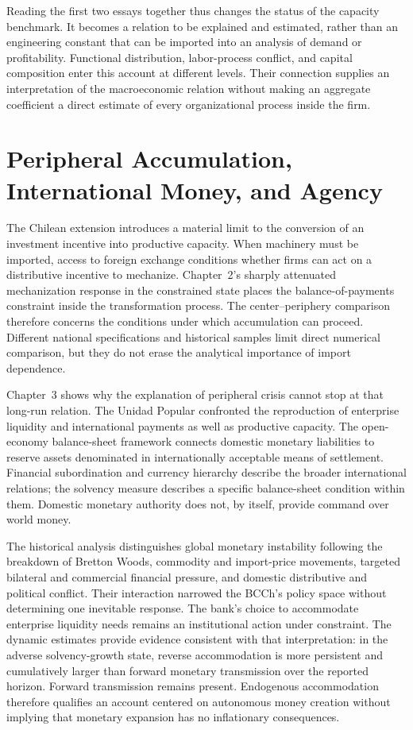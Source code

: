 Reading the first two essays together thus changes the status of the capacity benchmark. It becomes a relation to be explained and estimated, rather than an engineering constant that can be imported into an analysis of demand or profitability. Functional distribution, labor-process conflict, and capital composition enter this account at different levels. Their connection supplies an interpretation of the macroeconomic relation without making an aggregate coefficient a direct estimate of every organizational process inside the firm.

\section*{Peripheral Accumulation, International Money, and Agency}

The Chilean extension introduces a material limit to the conversion of an investment incentive into productive capacity. When machinery must be imported, access to foreign exchange conditions whether firms can act on a distributive incentive to mechanize. Chapter~2's sharply attenuated mechanization response in the constrained state places the balance-of-payments constraint inside the transformation process. The center--periphery comparison therefore concerns the conditions under which accumulation can proceed. Different national specifications and historical samples limit direct numerical comparison, but they do not erase the analytical importance of import dependence.

Chapter~3 shows why the explanation of peripheral crisis cannot stop at that long-run relation. The Unidad Popular confronted the reproduction of enterprise liquidity and international payments as well as productive capacity. The open-economy balance-sheet framework connects domestic monetary liabilities to reserve assets denominated in internationally acceptable means of settlement. Financial subordination and currency hierarchy describe the broader international relations; the solvency measure describes a specific balance-sheet condition within them. Domestic monetary authority does not, by itself, provide command over world money.

The historical analysis distinguishes global monetary instability following the breakdown of Bretton Woods, commodity and import-price movements, targeted bilateral and commercial financial pressure, and domestic distributive and political conflict. Their interaction narrowed the BCCh's policy space without determining one inevitable response. The bank's choice to accommodate enterprise liquidity needs remains an institutional action under constraint. The dynamic estimates provide evidence consistent with that interpretation: in the adverse solvency-growth state, reverse accommodation is more persistent and cumulatively larger than forward monetary transmission over the reported horizon. Forward transmission remains present. Endogenous accommodation therefore qualifies an account centered on autonomous money creation without implying that monetary expansion has no inflationary consequences.

